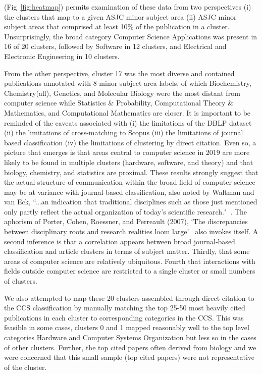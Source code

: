 (Fig~\ref{fig:heatmap}) permits examination of these data from two perspectives (i) the clusters that map to a given ASJC minor subject area (ii) ASJC minor subject areas that comprised at least 10\% of the publication in a cluster. Unsurprisingly, the broad category Computer Science Applications was present in 16 of 20 clusters, followed by Software in 12 clusters, and Electrical and Electronic Engineering in 10 clusters.

From the other perspective, cluster 17 was the most diverse and contained publications annotated with 8 minor subject area labels, of which Biochemistry, Chemistry(all), Genetics, and Molecular Biology were the most distant from computer science while Statistics \& Probability, Computational Theory \& Mathematics, and Computational Mathematics are closer. It is important to be reminded of the caveats associated with (i) the limitations of the DBLP dataset (ii) the limitations of cross-matching to Scopus (iii) the limitations of journal based classification (iv) the limitations of clustering by direct citation. Even so, a picture that emerges is that areas central to computer science in 2019 are more likely to be found in multiple clusters (hardware, software, and theory) and that biology, chemistry, and statistics are proximal.  These results strongly suggest that the actual structure of communication within the broad field of computer science may be at variance with journal-based classification, also noted by Waltman and van Eck, ``...an indication that traditional disciplines such as those just mentioned only partly reflect the actual organization of today's scientific research."~\cite{waltman_new_2012}. The aphorism of Porter, Cohen, Roessner, and Perreault (2007), `The discrepancies between disciplinary roots and research realities loom large'~\cite{porter_measuring_2007} also invokes itself. A second inference is that a correlation appears between broad journal-based classification and article clusters in terms of subject matter. Thirdly, that some areas of computer science are relatively ubiquitous. Fourth that interactions with fields outside computer science are restricted to a single cluster or small numbers of clusters. 

We also attempted to map these 20 clusters assembled through direct citation to the CCS classification by manually matching the top 25-50 most heavily cited publications in each cluster to corresponding categories in the CCS. This was feasible in some cases, clusters 0 and 1 mapped reasonably well to the top level categories Hardware and Computer Systems Organization but less so in the cases of other clusters. Further, the top cited papers often derived from biology and we were concerned that this small sample (top cited papers) were not representative of the cluster. 

